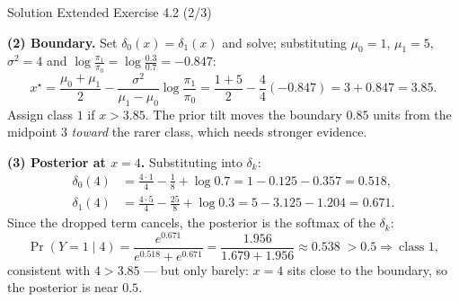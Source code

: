 \documentclass[aspectratio=169,11pt]{beamer}
\begin{document}
\begin{frame}{Solution \textemdash{} Extended Exercise 4.2 (2/3)}
\begin{solutionbox}
\scriptsize
\textbf{(2) Boundary.} Set $\delta_0(x)=\delta_1(x)$ and solve;
substituting $\mu_0=1$, $\mu_1=5$, $\sigma^2=4$ and
$\log\frac{\pi_1}{\pi_0}=\log\frac{0.3}{0.7}=-0.847$:
\[
  x^\star=\frac{\mu_0+\mu_1}{2}
          -\frac{\sigma^2}{\mu_1-\mu_0}\log\frac{\pi_1}{\pi_0}
        =\frac{1+5}{2}-\frac{4}{4}(-0.847)
        =3+0.847=3.85 .
\]
Assign class $1$ if $x>3.85$. The prior tilt moves the boundary
$0.85$ units from the midpoint $3$ \emph{toward} the rarer class, which
needs stronger evidence.

\vspace{1mm}
\textbf{(3) Posterior at $x=4$.} Substituting into $\delta_k$:
\[
\begin{aligned}
  \delta_0(4)&=\tfrac{4\cdot1}{4}-\tfrac{1}{8}+\log 0.7
              =1-0.125-0.357=0.518,\\
  \delta_1(4)&=\tfrac{4\cdot5}{4}-\tfrac{25}{8}+\log 0.3
              =5-3.125-1.204=0.671.
\end{aligned}
\]
Since the dropped term cancels, the posterior is the softmax of the
$\delta_k$:
\[
  \Pr(Y=1\mid 4)=\frac{e^{0.671}}{e^{0.518}+e^{0.671}}
  =\frac{1.956}{1.679+1.956}\approx 0.538
  \;>0.5\Rightarrow\ \text{class } 1 ,
\]
consistent with $4>3.85$ --- but only barely: $x=4$ sits close to the
boundary, so the posterior is near $0.5$.
\end{solutionbox}
\end{frame}
\end{document}
